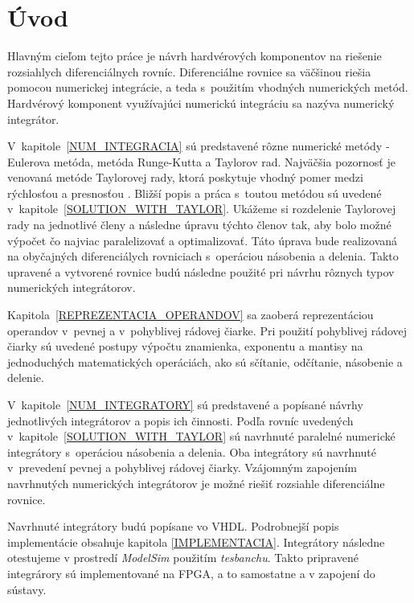 
\chapter{Úvod}
Hlavným cieľom tejto práce je návrh hardvérových komponentov na riešenie rozsiahlych diferenciálnych rovníc. Diferenciálne rovnice sa väčšinou riešia pomocou numerickej integrácie, a teda s~použitím vhodných numerických metód. Hardvérový komponent využívajúci numerickú integráciu sa nazýva numerický integrátor.

V~kapitole~\ref{NUM_INTEGRACIA} sú predstavené rôzne numerické metódy - Eulerova metóda, metóda Runge-Kutta a Taylorov rad. Najväčšia pozornosť je venovaná metóde Taylorovej rady, ktorá poskytuje vhodný pomer medzi rýchlosťou a presnosťou \cite{KunovskyH}. Bližší popis a práca s~toutou metódou sú uvedené v~kapitole~\ref{SOLUTION_WITH_TAYLOR}. Ukážeme si rozdelenie Taylorovej rady na jednotlivé členy a následne úpravu týchto členov tak, aby bolo možné výpočet čo najviac paralelizovať a optimalizovať. Táto úprava bude realizovaná na obyčajných diferenciálych rovniciach s~operáciou násobenia a delenia. Takto upravené a vytvorené rovnice budú následne použité pri návrhu rôznych typov numerických integrátorov.

Kapitola~\ref{REPREZENTACIA_OPERANDOV} sa zaoberá reprezentáciou operandov v~pevnej a v~pohyblivej rádovej čiarke. Pri použití pohyblivej rádovej čiarky sú uvedené postupy výpočtu znamienka, exponentu a mantisy na jednoduchých matematických operáciách, ako sú sčítanie, odčítanie, násobenie a delenie.

V~kapitole~\ref{NUM_INTEGRATORY} sú predstavené a popísané návrhy jednotlivých integrátorov a popis ich činnosti. Podľa rovníc uvedených v~kapitole~\ref{SOLUTION_WITH_TAYLOR} sú navrhnuté paralelné numerické integrátory s~operáciou násobenia a delenia. Oba integrátory sú navrhnuté v~prevedení pevnej a pohyblivej rádovej čiarky. Vzájomným zapojením navrhnutých numerických integrátorov je možné riešiť rozsiahle diferenciálne rovnice.

Navrhnuté integrátory budú popísane vo VHDL. Podrobnejší popis implementácie obsahuje kapitola \ref{IMPLEMENTACIA}. Integrátory následne otestujeme v prostredí \textit{ModelSim} použitím \textit{tesbanchu}. Takto pripravené integrárory sú implementované na FPGA, a to samostatne a v zapojení do sústavy.


